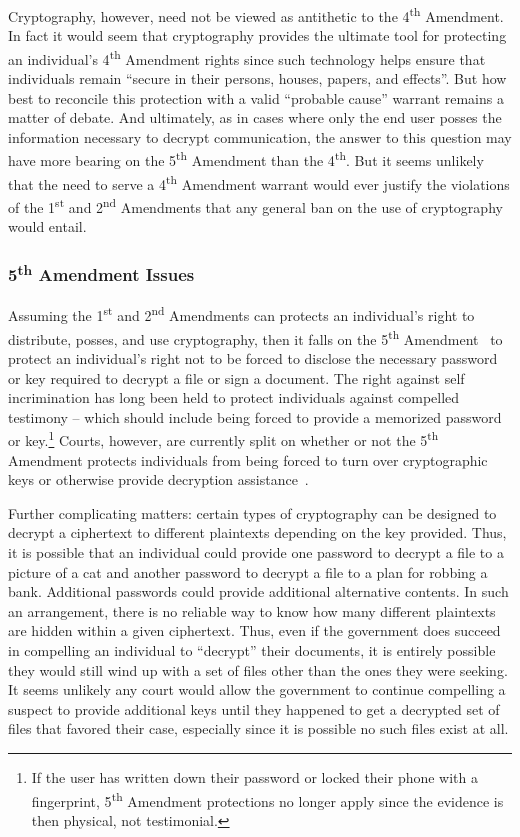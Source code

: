 Cryptography, however, need not be viewed as antithetic to the
4\textsuperscript{th} Amendment. In fact it would seem that
cryptography provides the ultimate tool for protecting an individual's
4\textsuperscript{th} Amendment rights since such technology helps
ensure that individuals remain ``secure in their persons, houses,
papers, and effects''. But how best to reconcile this protection with
a valid ``probable cause'' warrant remains a matter of debate. And
ultimately, as in cases where only the end user posses the information
necessary to decrypt communication, the answer to this question may
have more bearing on the 5\textsuperscript{th} Amendment than the
4\textsuperscript{th}. But it seems unlikely that the need to serve a
4\textsuperscript{th} Amendment warrant would ever justify the
violations of the 1\textsuperscript{st} and 2\textsuperscript{nd}
Amendments that any general ban on the use of cryptography would
entail.

\subsubsection{5\textsuperscript{th} Amendment Issues}

Assuming the 1\textsuperscript{st} and 2\textsuperscript{nd}
Amendments can protects an individual's right to distribute, posses,
and use cryptography, then it falls on the 5\textsuperscript{th}
Amendment~\cite{us-constitution-amend5} to protect an individual's
right not to be forced to disclose the necessary password or key
required to decrypt a file or sign a document. The right against self
incrimination has long been held to protect individuals against
compelled testimony -- which should include being forced to provide a
memorized password or key.\footnote{If the user has written down their
  password or locked their phone with a fingerprint,
  5\textsuperscript{th} Amendment protections no longer apply since
  the evidence is then physical, not testimonial.}  Courts, however,
are currently split on whether or not the 5\textsuperscript{th}
Amendment protects individuals from being forced to turn over
cryptographic keys or otherwise provide decryption
assistance~\cite{usvboucher, commonwealthvgelfgatt, usvdoe}.

Further complicating matters: certain types of cryptography can be
designed to decrypt a ciphertext to different plaintexts depending on
the key provided. Thus, it is possible that an individual could
provide one password to decrypt a file to a picture of a cat and
another password to decrypt a file to a plan for robbing a
bank. Additional passwords could provide additional alternative
contents. In such an arrangement, there is no reliable way to know how
many different plaintexts are hidden within a given ciphertext. Thus,
even if the government does succeed in compelling an individual to
``decrypt'' their documents, it is entirely possible they would still
wind up with a set of files other than the ones they were seeking.  It
seems unlikely any court would allow the government to continue
compelling a suspect to provide additional keys until they happened to
get a decrypted set of files that favored their case, especially since
it is possible no such files exist at all.

